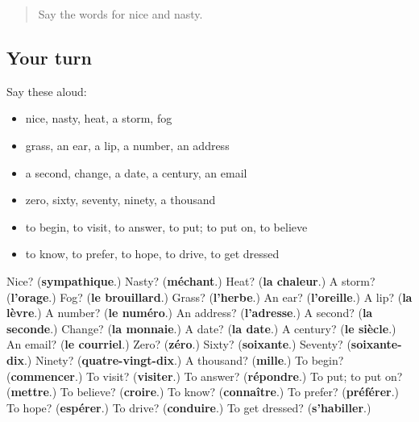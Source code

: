 \begin{quote}
Say the words for nice and nasty.
\end{quote}

\subsection*{Your turn}
Say these aloud:

\begin{itemize}
\raggedright
  \item nice, nasty, heat, a storm, fog
  \item grass, an ear, a lip, a number, an address
  \item a second, change, a date, a century, an email
  \item zero, sixty, seventy, ninety, a thousand
  \item to begin, to visit, to answer, to put; to put on, to believe
  \item to know, to prefer, to hope, to drive, to get dressed
\end{itemize}

\begin{tcolorbox}[breakable,colback=teal!4,colframe=teal!35!black,title={Before you move on}]
Nice? (\textbf{sympathique}.) Nasty? (\textbf{méchant}.) Heat? (\textbf{la chaleur}.) A storm? (\textbf{l'orage}.) Fog? (\textbf{le brouillard}.) Grass? (\textbf{l'herbe}.) An ear? (\textbf{l'oreille}.) A lip? (\textbf{la lèvre}.) A number? (\textbf{le numéro}.) An address? (\textbf{l'adresse}.) A second? (\textbf{la seconde}.) Change? (\textbf{la monnaie}.) A date? (\textbf{la date}.) A century? (\textbf{le siècle}.) An email? (\textbf{le courriel}.) Zero? (\textbf{zéro}.) Sixty? (\textbf{soixante}.) Seventy? (\textbf{soixante-dix}.) Ninety? (\textbf{quatre-vingt-dix}.) A thousand? (\textbf{mille}.) To begin? (\textbf{commencer}.) To visit? (\textbf{visiter}.) To answer? (\textbf{répondre}.) To put; to put on? (\textbf{mettre}.) To believe? (\textbf{croire}.) To know? (\textbf{connaître}.) To prefer? (\textbf{préférer}.) To hope? (\textbf{espérer}.) To drive? (\textbf{conduire}.) To get dressed? (\textbf{s'habiller}.)
\end{tcolorbox}
